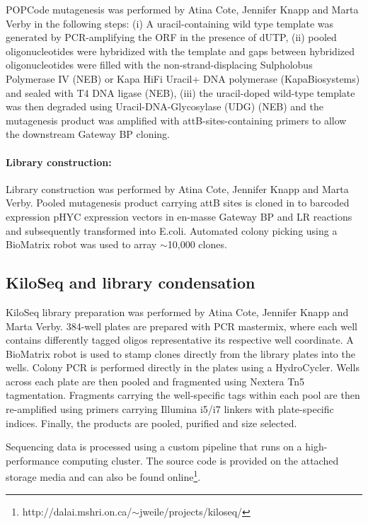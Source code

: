 POPCode mutagenesis was performed by Atina Cote, Jennifer Knapp and Marta Verby in the following steps: (i) A uracil-containing wild type template was generated by PCR-amplifying the ORF in the presence of dUTP, (ii) pooled oligonucleotides were hybridized with the template and gaps between hybridized oligonucleotides were filled with the non-strand-displacing Sulpholobus Polymerase IV (NEB) or Kapa HiFi Uracil+ DNA polymerase (KapaBiosystems) and sealed with T4 DNA ligase (NEB), (iii) the uracil-doped wild-type template was then degraded using Uracil-DNA-Glycosylase (UDG) (NEB) and the mutagenesis product was amplified with attB-sites-containing primers to allow the downstream Gateway BP cloning.

\paragraph{Library construction:} Library construction was performed by Atina Cote, Jennifer Knapp and Marta Verby. Pooled mutagenesis product carrying attB sites is cloned in to barcoded expression pHYC expression vectors in en-masse Gateway BP and LR reactions and subsequently transformed into E.coli. Automated colony picking using a BioMatrix robot was used to array $\sim$10,000 clones.

\subsection{KiloSeq and library condensation}

KiloSeq library preparation was performed by Atina Cote, Jennifer Knapp and Marta Verby. 384-well plates are prepared with PCR mastermix, where each well contains differently tagged oligos representative its respective well coordinate. A BioMatrix robot is used to stamp clones directly from the library plates into the wells. Colony PCR is performed directly in the plates using a HydroCycler. Wells across each plate are then pooled and fragmented using Nextera Tn5 tagmentation. Fragments carrying the well-specific tags within each pool are then re-amplified using primers carrying Illumina i5/i7 linkers with plate-specific indices. Finally, the products are pooled, purified and size selected.

Sequencing data is processed using a custom pipeline that runs on a high-performance computing cluster. The source code is provided on the attached storage media and can also be found online\footnote{http://dalai.mshri.on.ca/$\sim$jweile/projects/kiloseq/}.

